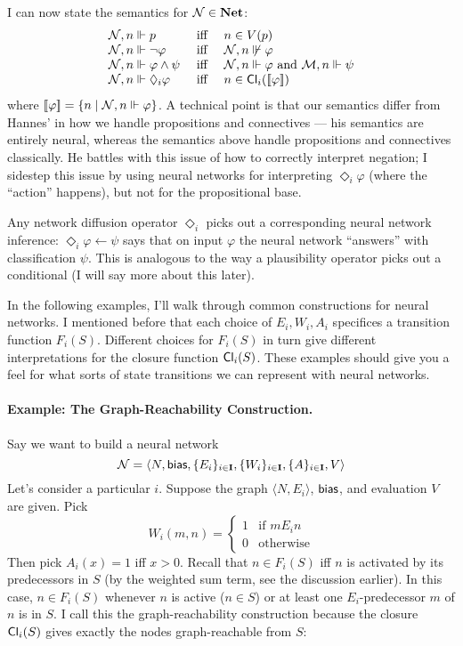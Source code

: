\documentclass[letterpaper]{article}
\begin{document}
I can now state the semantics for $\mathcal{N} \in \textrm{\textbf{Net}}$:
\[
\begin{array}{lcl}
    \mathcal{N}, n \Vdash p & \mbox{ iff } & n \in V(p)\\
    \mathcal{N}, n \Vdash \neg \varphi & \mbox{ iff } & \mathcal{N}, n \not \Vdash \varphi\\
    \mathcal{N}, n \Vdash \varphi \land \psi & \mbox{ iff } & \mathcal{N}, n \Vdash \varphi \mbox{ and } \mathcal{M}, n \Vdash \psi\\
    \mathcal{N}, n \Vdash \Diamond_i \varphi & \mbox{ iff } & 
    n \in \mathsf{Cl}_i([\![\mbox{\em $ \varphi $\/}]\!])
\end{array}
\]
where $[\![\mbox{\em $ \varphi $\/}]\!] = \{ n \mid \mathcal{N}, n \Vdash \varphi \}$.  A technical point is that our semantics differ from Hannes' \cite{leitgeb2001nonmonotonic} in how we handle propositions and connectives --- his semantics are entirely neural, whereas the semantics above handle propositions and connectives classically.  He battles with this issue of how to correctly interpret negation; I sidestep this issue by using neural networks for interpreting $\Diamond_i \varphi$ (where the ``action'' happens), but not for the propositional base.

Any network diffusion operator $\Diamond_i$ picks out a corresponding neural network inference: $\Diamond_i \varphi \leftarrow \psi$ says that on input $\varphi$ the neural network ``answers'' with classification $\psi$.  This is analogous to the way a plausibility operator picks out a conditional (I will say more about this later).

In the following examples, I'll walk through common constructions for neural networks.  I mentioned before that each choice of $E_i, W_i, A_i$ specifices a transition function $F_i(S)$.  Different choices for $F_i(S)$ in turn give different interpretations for the closure function $\mathsf{Cl}_i(S)$.  These examples should give you a feel for what sorts of state transitions we can represent with neural networks.

\paragraph*{Example: The Graph-Reachability Construction.}
    Say we want to build a neural network 
    \[\mathcal{N} = \langle N, \mathsf{bias}, \{ E_i \}_{i \in \textbf{I}}, \{ W_i \}_{i \in \textbf{I}}, \{ A \}_{i \in \textbf{I}}, V \rangle\]
    Let's consider a particular $i$. Suppose the graph $\langle N, E_i \rangle$, $\mathsf{bias}$, and evaluation $V$ are given.  Pick 
    \[
        W_i(m, n) = 
        \begin{cases}
            1 & \mbox{if } m{E_i}n \\
            0 & \mbox{otherwise}
        \end{cases}
    \]
    Then pick $A_i(x) = 1$ iff $x > 0$. Recall that $n \in F_i(S)$ iff $n$ is activated by its predecessors in $S$ (by the weighted sum term, see the discussion earlier).  In this case, $n \in F_i(S)$ whenever $n$ is active ($n \in S$) or at least one $E_i$-predecessor $m$ of $n$ is in $S$.  I call this the graph-reachability construction because the closure $\mathsf{Cl}_i(S)$ gives exactly the nodes graph-reachable from $S$:
\end{document}
